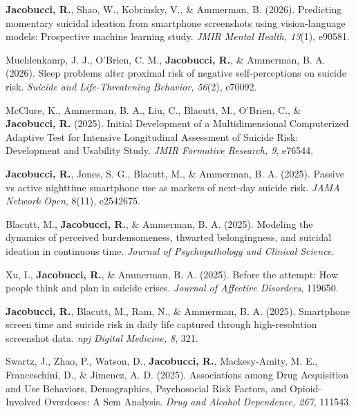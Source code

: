 \documentclass[letterpaper,10pt]{article}
\begin{document}
\begin{etaremune}
	\item \textbf{Jacobucci, R.}, Shao, W., Kobrinsky, V., \& Ammerman, B. (2026). Predicting momentary suicidal ideation from smartphone screenshots using vision-language models: Prospective machine learning study. \emph{JMIR Mental Health, 13}(1), e90581.
	
	\item Muehlenkamp, J. J., O'Brien, C. M., \textbf{Jacobucci, R.}, \& Ammerman, B. A. (2026). Sleep problems alter proximal risk of negative self-perceptions on suicide risk. \emph{Suicide and Life-Threatening Behavior, 56}(2), e70092.

	
	\item McClure, K., Ammerman, B. A., Liu, C., Blacutt, M., O'Brien, C., \& \textbf{Jacobucci, R.} (2025). Initial Development of a Multidimensional Computerized Adaptive Test for Intensive Longitudinal Assessment of Suicide Risk: Development and Usability Study. \emph{JMIR Formative Research, 9}, e76544.
	
		\item \textbf{Jacobucci, R.}, Jones, S. G., Blacutt, M., \& Ammerman, B. A. (2025). Passive vs active nighttime smartphone use as markers of next-day suicide risk. \emph{JAMA Network Open}, 8(11), e2542675. 
	
	\item Blacutt, M., \textbf{Jacobucci, R.}, \& Ammerman, B. A. (2025). Modeling the dynamics of perceived burdensomeness, thwarted belongingness, and suicidal ideation in continuous time. \emph{Journal of Psychopathology and Clinical Science.}
	
	\item Xu, I., \textbf{Jacobucci, R.}, \& Ammerman, B. A. (2025). Before the attempt: How people think and plan in suicide crises. \emph{Journal of Affective Disorders}, 119650.
	
	\item \textbf{Jacobucci, R.}, Blacutt, M., Ram, N., \& Ammerman, B. A. (2025). Smartphone screen time and suicide risk in daily life captured through high-resolution screenshot data. \emph{npj Digital Medicine, 8}, 321.
	
	\item Swartz, J., Zhao, P., Watson, D., \textbf{Jacobucci, R.}, Mackesy-Amity, M. E., Franceschini, D., \& Jimenez, A. D. (2025). Associations among Drug Acquisition and Use Behaviors, Demographics, Psychosocial Risk Factors, and Opioid-Involved Overdoses: A Sem Analysis. \emph{Drug and Alcohol Dependence, 267}, 111543.
	

\end{etaremune}
\end{document}
